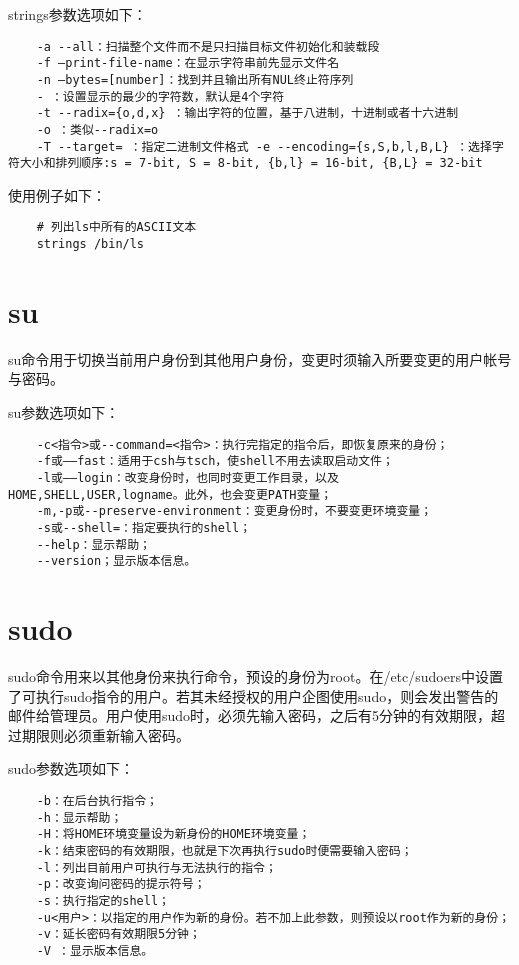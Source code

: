 \documentclass[a4paper,left=2.5cm,right=2.5cm,11pt]{article}
\begin{document}
	strings参数选项如下：
	\begin{lstlisting}
	-a --all：扫描整个文件而不是只扫描目标文件初始化和装载段 
	-f –print-file-name：在显示字符串前先显示文件名 
	-n –bytes=[number]：找到并且输出所有NUL终止符序列 
	- ：设置显示的最少的字符数，默认是4个字符 
	-t --radix={o,d,x} ：输出字符的位置，基于八进制，十进制或者十六进制 
	-o ：类似--radix=o 
	-T --target= ：指定二进制文件格式 -e --encoding={s,S,b,l,B,L} ：选择字符大小和排列顺序:s = 7-bit, S = 8-bit, {b,l} = 16-bit, {B,L} = 32-bit
	\end{lstlisting}

	使用例子如下：
	\begin{lstlisting}
	# 列出ls中所有的ASCII文本
	strings /bin/ls
	\end{lstlisting}

\section{su}
	su命令用于切换当前用户身份到其他用户身份，变更时须输入所要变更的用户帐号与密码。\par

	su参数选项如下：
	\begin{lstlisting}
	-c<指令>或--command=<指令>：执行完指定的指令后，即恢复原来的身份； 
	-f或——fast：适用于csh与tsch，使shell不用去读取启动文件； 
	-l或——login：改变身份时，也同时变更工作目录，以及HOME,SHELL,USER,logname。此外，也会变更PATH变量； 
	-m,-p或--preserve-environment：变更身份时，不要变更环境变量； 
	-s或--shell=：指定要执行的shell； 
	--help：显示帮助； 
	--version；显示版本信息。
	\end{lstlisting}

\section{sudo}
	sudo命令用来以其他身份来执行命令，预设的身份为root。在/etc/sudoers中设置了可执行sudo指令的用户。若其未经授权的用户企图使用sudo，则会发出警告的邮件给管理员。用户使用sudo时，必须先输入密码，之后有5分钟的有效期限，超过期限则必须重新输入密码。\par

	sudo参数选项如下：
	\begin{lstlisting}
	-b：在后台执行指令； 
	-h：显示帮助； 
	-H：将HOME环境变量设为新身份的HOME环境变量； 
	-k：结束密码的有效期限，也就是下次再执行sudo时便需要输入密码；
	-l：列出目前用户可执行与无法执行的指令； 
	-p：改变询问密码的提示符号； 
	-s：执行指定的shell； 
	-u<用户>：以指定的用户作为新的身份。若不加上此参数，则预设以root作为新的身份； 
	-v：延长密码有效期限5分钟； 
	-V ：显示版本信息。
	\end{lstlisting}
\end{document}
